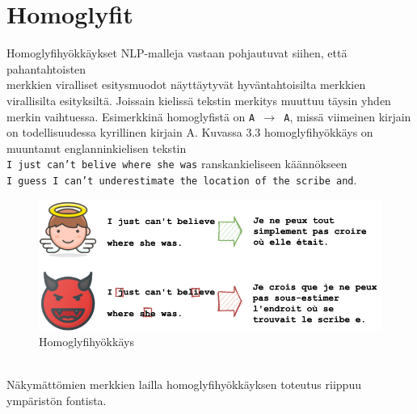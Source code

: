 \section{Homoglyfit}
Homoglyfihyökkäykset NLP-malleja vastaan pohjautuvat siihen, että pahantahtoisten\\ merkkien viralliset esitysmuodot näyttäytyvät hyväntahtoisilta merkkien virallisilta esityksiltä. Jois\-sain kielissä tekstin merkitys muuttuu täysin yhden merkin vaihtuessa. Esimerkkinä homoglyfistä on \texttt{A $\rightarrow$ A}, missä viimeinen kirjain on todellisuudessa kyrillinen kirjain A. Kuvassa 3.3 homoglyfihyökkäys on muuntanut englanninkielisen tekstin\\ \texttt{I just can't belive where she was} ranskankieliseen käännökseen\\ \texttt{I guess I can't underestimate the location of the scribe and}.
\begin{figure}[hbt]
  \includegraphics[scale=0.5]{figures/homoglyph.png}
  \caption{Homoglyfihyökkäys \citep{boucher2021bad}}
\end{figure}
\\Näkymättömien merkkien lailla homoglyfihyökkäyksen toteutus riippuu ympäristön fontista. \citep{boucher2021bad}


